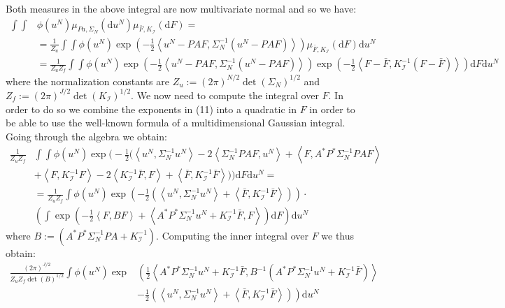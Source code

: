 Both measures in the above integral are now multivariate normal and so we have:
\begin{align}
    \int\int&\phi(u^{N})\mu_{Pa,\Sigma_N}(\mathrm{d}u^{N})\mu_{\bar{F},K_{\mathcal{I}}}(\mathrm{d}F)= \nonumber \\ &=\frac{1}{Z_u}\int\int\phi(u^{N})\exp\left(-\frac{1}{2}\left\langle u^{N}-PAF,\Sigma_{N}^{-1}(u^{N}-PAF) \right\rangle\right)\mu_{\bar{F},K_{\mathcal{I}}}(\mathrm{d}F)\mathrm{d}u^{N} \nonumber \\
    &=\frac{1}{Z_{u}Z_{f}}\int\int\phi(u^{N})\exp\left(-\frac{1}{2}\left\langle u^{N}-PAF,\Sigma_{N}^{-1}(u^{N}-PAF)\right\rangle\right)\exp\left(-\frac{1}{2}\left\langle F-\bar{F},K_{\mathcal{I}}^{-1}(F-\bar{F}) \right\rangle\right)\mathrm{d}F\mathrm{d}u^{N}
\end{align}
where the normalization constants are $Z_u:=(2\pi)^{N/2}\det(\Sigma_N)^{1/2}$ and $Z_f:=(2\pi)^{J/2}\det(K_\mathcal{I})^{1/2}$. We now need to compute the integral over $F$. In order to do so we combine the exponents in (11) into a quadratic in $F$ in order to be able to use the well-known formula of a multidimensional Gaussian integral. Going through the algebra we obtain:
\begin{align}
    \frac{1}{Z_{u}Z_{f}}&\int\int\phi(u^{N})\exp\Bigg(-\frac{1}{2}\Big(\left\langle u^{N},\Sigma_{N}^{-1}u^{N} \right\rangle - 2\left\langle \Sigma_{N}^{-1}PAF,u^{N}\right\rangle + \left\langle F,A^{*}P^{*}\Sigma_{N}^{-1}PAF\right\rangle \nonumber \\
    &+ \left\langle F,K_{\mathcal{I}}^{-1}F\right\rangle - 2 \left\langle K_{\mathcal{I}}^{-1}\bar{F},F \right\rangle + \left\langle \bar{F},K_{\mathcal{I}}^{-1}\bar{F}\right\rangle \Big)\Bigg)\mathrm{d}F\mathrm{d}u^{N} = \nonumber \\
    &=\frac{1}{Z_{u}Z_{f}}\int\phi(u^{N})\exp\left(-\frac{1}{2}\left(\left\langle u^{N},\Sigma_{N}^{-1} u^{N} \right\rangle + \left\langle \bar{F},K_{\mathcal{I}}^{-1}\bar{F} \right\rangle\right)\right) \cdot \nonumber \\
    &\left(\int\exp\left(-\frac{1}{2}\left\langle F,BF \right\rangle + \left\langle A^{*}P^{*}\Sigma_{N}^{-1}u^{N} + K_{\mathcal{I}}^{-1}\bar{F},F \right\rangle\right)\mathrm{d}F\right)\mathrm{d}u^{N}
\end{align}
where $B:=\left(A^{*}P^{*}\Sigma_{N}^{-1}PA+K_{\mathcal{I}}^{-1}\right)$. Computing the inner integral over $F$ we thus obtain:
\begin{align}
    \frac{(2\pi)^{J/2}}{Z_{u}Z_{f}\det(B)^{1/2}}\int\phi(u^{N})\exp&\left(\frac{1}{2}\left\langle A^{*}P^{*}\Sigma_{N}^{-1}u^{N} + K_{\mathcal{I}}^{-1}\bar{F}, B^{-1}\left(A^{*}P^{*}\Sigma_{N}^{-1}u^{N} + K_{\mathcal{I}}^{-1}\bar{F}\right) \right\rangle\right. \nonumber \\
    &\left.-\frac{1}{2}\left(\left\langle u^{N}, \Sigma_{N}^{-1}u^{N}\right\rangle + \left\langle \bar{F},K_{\mathcal{I}}^{-1}\bar{F} \right\rangle \right)\right)\mathrm{d}u^{N}
\end{align}
